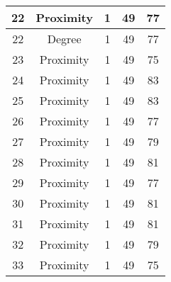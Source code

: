 \documentclass[results.tex]{subfiles}
\begin{document}
\begin{center}
\begin{tabular}{| c || c | c | c | c |}
            \hline
            22                      & Proximity                    & 1                      & 49                      & 77                   \\
            \hline
            22                      & Degree                       & 1                      & 49                      & 77                   \\
            \hline
            23                      & Proximity                    & 1                      & 49                      & 75                   \\
            \hline
            24                      & Proximity                    & 1                      & 49                      & 83                   \\
            \hline
            25                      & Proximity                    & 1                      & 49                      & 83                   \\
            \hline
            26                      & Proximity                    & 1                      & 49                      & 77                   \\
            \hline
            27                      & Proximity                    & 1                      & 49                      & 79                   \\
            \hline
            28                      & Proximity                    & 1                      & 49                      & 81                   \\
            \hline
            29                      & Proximity                    & 1                      & 49                      & 77                   \\
            \hline
            30                      & Proximity                    & 1                      & 49                      & 81                   \\
            \hline
            31                      & Proximity                    & 1                      & 49                      & 81                   \\
            \hline
            32                      & Proximity                    & 1                      & 49                      & 79                   \\
            \hline
            33                      & Proximity                    & 1                      & 49                      & 75                   \\

\end{tabular}
\end{center}
\end{document}
